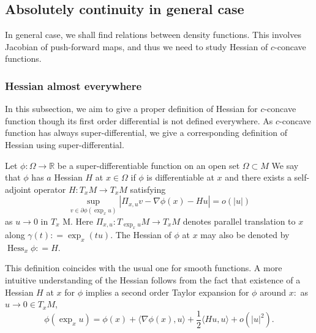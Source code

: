 \subsection{Absolutely continuity in general case}

In general case, we shall find relations between density functions.
This involves Jacobian of push-forward maps,
and thus we need to study Hessian of $c$-concave functions.

\subsubsection{Hessian almost everywhere}

In this subsection, we aim to give a proper definition of Hessian
for $c$-concave function
though its first order differential is not defined everywhere.
As $c$-concave function has always super-differential, we give a corresponding
definition of Hessian using super-differential.

\begin{defn}[Hessian]
	Let \( \phi : \Omega \rightarrow \mathbb { R } \) be
	a	super-differentiable function
	on an open set \( \Omega \subset M \)
	We say that \( \phi \) has \( a \) Hessian \( H \) at \( x \in \Omega \) if \( \phi \) is differentiable at \( x \)
	and there exists a self-adjoint operator \( H : T _ { x } M \rightarrow T _ { x } M \) satisfying
	\begin{equation}
		\label{defn:hessian}
		\sup _ { v \in \partial \phi \left( \exp _ { x } u \right) } \left| \Pi _ { x , u } v - \nabla \phi ( x ) - H u \right| = o ( | u | )
	\end{equation}
	as \( u \rightarrow 0 \) in \( T _ { x } \) M. Here \( \Pi _ { x , u } : T _ { \exp _ { x } u } M \rightarrow T _ { x } M \) denotes parallel translation to \( x \) along \( \gamma ( t ) : = \exp _ { x } ( t u ) . \) The Hessian of \( \phi \) at \( x \) may also be denoted
	by \( \operatorname { Hess } _ { x } \phi : = H \).
\end{defn}

This definition coincides with the usual one for smooth functions. A more intuitive understanding of the Hessian follows from the fact that existence of a Hessian \( H \) at \( x \) for \( \phi \) implies a second order Taylor expansion for \( \phi \) around \( x : \) as \( u \rightarrow 0 \in T _ { x } M \),
\begin{equation}
	\label{equa:hessian_expan}
	\phi \left( \exp _ { x } u \right) = \phi ( x ) + \langle \nabla \phi ( x ) , u \rangle + \frac { 1 } { 2 } \langle H u , u \rangle + o \left( | u | ^ { 2 } \right).
\end{equation}

